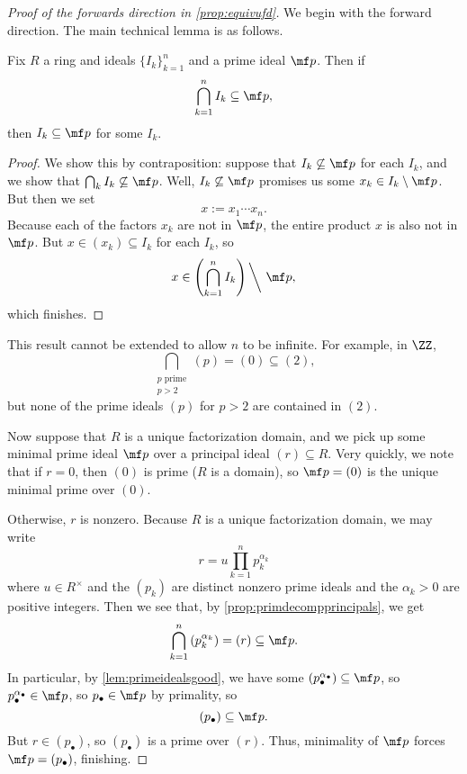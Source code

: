 \begin{proof}[Proof of the forwards direction in \autoref{prop:equivufd}]
	We begin with the forward direction. The main technical lemma is as follows.
	\begin{lemma} \label{lem:primeidealsgood}
		Fix $R$ a ring and ideals $\{I_k\}_{k=1}^n$ and a prime ideal $\mf p$. Then if
		\[\bigcap_{k=1}^nI_k\subseteq\mf p,\]
		then $I_k\subseteq\mf p$ for some $I_k$.
	\end{lemma}
	\begin{proof}
		We show this by contraposition: suppose that $I_k\not\subseteq\mf p$ for each $I_k$, and we show that $\bigcap_kI_k\not\subseteq\mf p$. Well, $I_k\not\subseteq\mf p$ promises us some $x_k\in I_k\setminus\mf p$. But then we set
		\[x:=x_1\cdots x_n.\]
		Because each of the factors $x_k$ are not in $\mf p$, the entire product $x$ is also not in $\mf p$. But $x\in(x_k)\subseteq I_k$ for each $I_k$, so
		\[x\in\left(\bigcap_{k=1}^nI_k\right){\mathbin\bigg\backslash}~\mf p,\]
		which finishes.
	\end{proof}
	\begin{remark}[Nir]
		This result cannot be extended to allow $n$ to be infinite. For example, in $\ZZ$,
		\[\bigcap_{\substack{p\text{ prime}\\p>2}}(p)=(0)\subseteq(2),\]
		but none of the prime ideals $(p)$ for $p>2$ are contained in $(2)$.
	\end{remark}
	Now suppose that $R$ is a unique factorization domain, and we pick up some minimal prime ideal $\mf p$ over a principal ideal $(r)\subseteq R$. Very quickly, we note that if $r=0$, then $(0)$ is prime ($R$ is a domain), so $\mf p=(0)$ is the unique minimal prime over $(0)$.
	
	Otherwise, $r$ is nonzero. Because $R$ is a unique factorization domain, we may write
	\[r=u\prod_{k=1}^np_k^{\alpha_k}\]
	where $u\in R^\times$ and the $(p_k)$ are distinct nonzero prime ideals and the $\alpha_k>0$ are positive integers. Then we see that, by \autoref{prop:primdecompprincipals}, we get
	\[\bigcap_{k=1}^n\left(p_k^{\alpha_k}\right)=(r)\subseteq\mf p.\]
	In particular, by \autoref{lem:primeidealsgood}, we have some $\left(p_\bullet^{\alpha_\bullet}\right)\subseteq\mf p$, so $p_\bullet^{\alpha_\bullet}\in\mf p$, so $p_\bullet\in\mf p$ by primality, so
	\[(p_\bullet)\subseteq\mf p.\]
	But $r\in(p_\bullet)$, so $(p_\bullet)$ is a prime over $(r)$. Thus, minimality of $\mf p$ forces $\mf p=(p_\bullet)$, finishing.
\end{proof}
